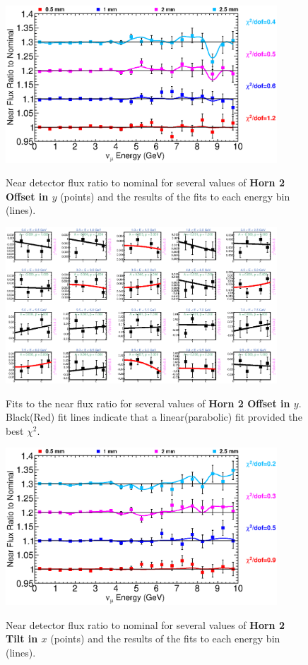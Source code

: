 \begin{figure}[ht]
  \begin{center}
    {\includegraphics[width=4.0in]{figures/Horn2YOffset_near_summary.eps}}
  \end{center}
\caption{ Near detector flux ratio to nominal for several values of {\bf Horn 2 Offset in $y$} (points) and the results of the fits to each energy bin (lines).}
\end{figure}

\begin{figure}[hb]
  \begin{center}
    {\includegraphics[width=4.0in]{figures/Horn2YOffset_near_fits.eps}}
  \end{center}
\caption{ Fits to the near flux ratio for several values of {\bf Horn 2 Offset in $y$}. Black(Red) fit lines indicate that a linear(parabolic) fit provided the best $\chi^2$. }
\end{figure}



\begin{figure}[ht]
  \begin{center}
    {\includegraphics[width=4.0in]{figures/Horn2XTilt_near_summary.eps}}
  \end{center}
\caption{ Near detector flux ratio to nominal for several values of {\bf Horn 2 Tilt in $x$} (points) and the results of the fits to each energy bin (lines).}
\end{figure}

